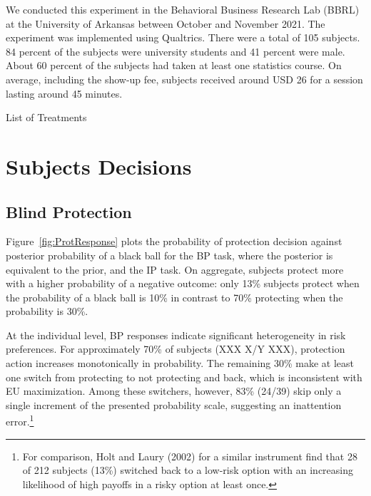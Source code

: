 \documentclass[12pt,a4paper]{article}
\newcommand{\agt}[1]{{\color{OliveGreen}#1}}
\begin{document}
We conducted this experiment in the Behavioral Business Research Lab (BBRL) at the University of Arkansas between October and November 2021.  The experiment was implemented using Qualtrics. There were a total of 105 subjects. 84 percent of the subjects were university students and 41 percent were male.  About 60 percent of the subjects had taken at least one statistics course. On average, including the show-up fee, subjects received around USD 26 for a session lasting around 45 minutes.  



\begin{table}[h!]
\caption{List of Treatments} \label{tab:treatments}

\end{table}


\vspace{20pt}
\section{Subjects Decisions}\label{sec:sanity}

\subsection{Blind Protection}

Figure~\ref{fig:ProtResponse} plots the probability of protection decision against posterior probability of a black ball for the BP task, where the posterior is equivalent to the prior, and the IP task. On aggregate, subjects protect more with a higher probability of a negative outcome: only 13\% subjects protect when the probability of a black ball is 10\% in contrast to 70\% protecting when the probability is 30\%. 

At the individual level, BP responses indicate significant heterogeneity in risk preferences. For approximately 70\% of subjects (\agt{XXX X/Y XXX}), protection action increases monotonically in probability. The remaining 30\% make at least one switch from protecting to not protecting and back, which is inconsistent with EU maximization. Among these switchers, however, 83\% (24/39) skip only a single increment of the presented probability scale, suggesting an inattention error.\footnote{For comparison, Holt and Laury (2002) for a similar instrument find that 28 of 212 subjects (13\%) switched back to a low-risk option with an increasing likelihood of high payoffs in a risky option at least once.} 
\end{document}
